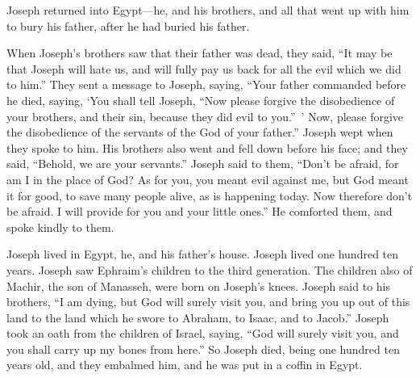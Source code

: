 {Joseph returned into Egypt—he, and his brothers, and all that went up with him to bury his father, after he had buried his father.
\par }{\PP {}When Joseph’s brothers saw that their father was dead, they said, “It may be that Joseph will hate us, and will fully pay us back for all the evil which we did to him.”
They sent a message to Joseph, saying, “Your father commanded before he died, saying,
‘You shall tell Joseph, “Now please forgive the disobedience of your brothers, and their sin, because they did evil to you.” ’ Now, please forgive the disobedience of the servants of the God of your father.” Joseph wept when they spoke to him.
His brothers also went and fell down before his face; and they said, “Behold, we are your servants.”
Joseph said to them, “Don’t be afraid, for am I in the place of God?
As for you, you meant evil against me, but God meant it for good, to save many people alive, as is happening today.
Now therefore don’t be afraid. I will provide for you and your little ones.” He comforted them, and spoke kindly to them.
\par }{\PP {}Joseph lived in Egypt, he, and his father’s house. Joseph lived one hundred ten years.
Joseph saw Ephraim’s children to the third generation. The children also of Machir, the son of Manasseh, were born on Joseph’s knees.
Joseph said to his brothers, “I am dying, but God will surely visit you, and bring you up out of this land to the land which he swore to Abraham, to Isaac, and to Jacob.”
Joseph took an oath from the children of Israel, saying, “God will surely visit you, and you shall carry up my bones from here.”
So Joseph died, being one hundred ten years old, and they embalmed him, and he was put in a coffin in Egypt.
\par }
